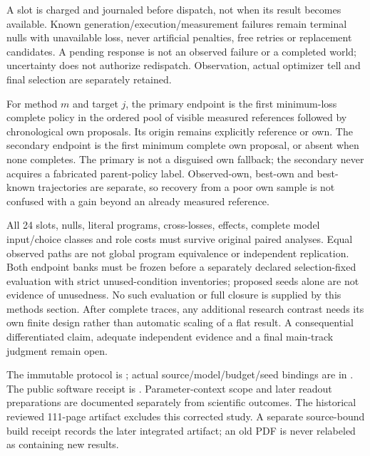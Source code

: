 A slot is charged and journaled before dispatch, not when its result becomes
available. Known generation/execution/measurement failures remain terminal
nulls with unavailable loss, never artificial penalties, free retries or
replacement candidates. A pending response is not an observed failure or a
completed world; uncertainty does not authorize redispatch. Observation, actual
optimizer tell and final selection are separately retained.

For method $m$ and target $j$, the primary endpoint is the first minimum-loss
complete policy in the ordered pool of visible measured references followed
by chronological own proposals. Its origin remains explicitly reference or
own. The secondary endpoint is the first minimum complete own proposal, or
absent when none completes. The primary is not a disguised own fallback;
the secondary never acquires a fabricated parent-policy label. Observed-own,
best-own and best-known trajectories are separate, so recovery from a poor own
sample is not confused with a gain beyond an already measured reference.

All 24 slots, nulls, literal programs, cross-losses, effects, complete model
input/choice classes and role costs must survive original paired analyses.
Equal observed paths are not global program equivalence or independent
replication. Both endpoint banks must be frozen before a separately declared
selection-fixed evaluation with strict unused-condition inventories; proposed
seeds alone are not evidence of unusedness. No such evaluation or full closure
is supplied by this methods section. After complete traces, any additional
research contrast needs its own finite design rather than automatic scaling
of a flat result. A consequential differentiated claim, adequate independent
evidence and a final main-track judgment remain open.

\begingroup\raggedright
The immutable protocol is
; actual
source/model/budget/seed bindings are in
.
The public software receipt is
.
Parameter-context scope and later readout preparations are documented separately
from scientific outcomes. The historical reviewed 111-page artifact excludes
this corrected study. A separate source-bound build receipt records the later
integrated artifact; an old PDF is never relabeled as containing new results.
\par\endgroup
\FloatBarrier
